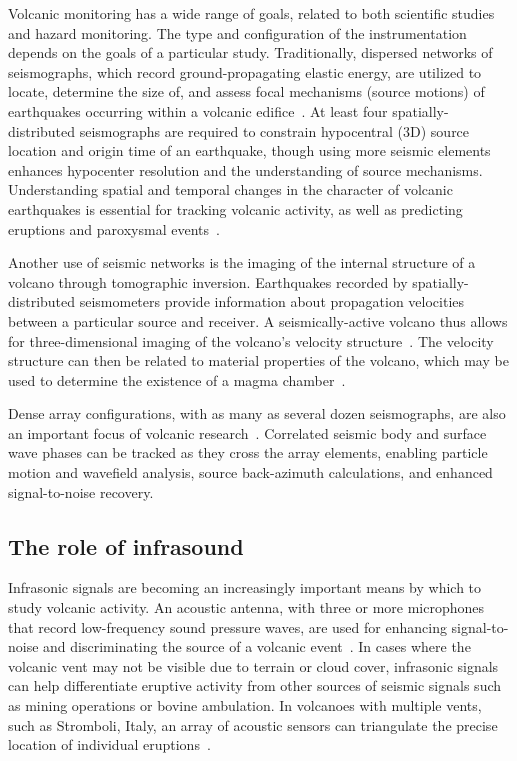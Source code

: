 Volcanic monitoring has a wide range of goals, related to both
scientific studies and hazard monitoring. The type and configuration
of the instrumentation depends on the goals of a particular study.
Traditionally, dispersed networks of seismographs, which record 
ground-propagating elastic energy, are utilized to locate, determine the 
size of, and assess focal mechanisms (source motions) of earthquakes 
occurring within a volcanic edifice~\cite{Chouet03}. 
At least four 
spatially-distributed seismographs are required to constrain hypocentral 
(3D) source location and origin time of an earthquake, though
using more seismic elements enhances hypocenter resolution and the 
understanding of source mechanisms. Understanding spatial and temporal 
changes in the character of volcanic earthquakes is essential
for tracking volcanic activity, as well as predicting eruptions 
and paroxysmal events~\cite{McNutt96}. 


Another use of seismic networks is the imaging of the internal
structure of a volcano through tomographic inversion.  Earthquakes
recorded by spatially-distributed seismometers provide information
about propagation velocities between a particular source and receiver.
A seismically-active volcano thus allows for three-dimensional imaging
of the volcano's velocity structure~\cite{Benz96,Phillips91}. The
velocity structure can then be related to material properties of the
volcano, which may be used to determine the existence of a
magma chamber~\cite{Lees89,Moran99}.

Dense array configurations, with as many as several dozen
seismographs, are also an important focus of volcanic
research~\cite{Dietel89,Neuberg94}. Correlated seismic body and surface wave
phases can be tracked as they cross the array elements, enabling
particle motion and wavefield analysis, source back-azimuth calculations,
and enhanced signal-to-noise recovery.

\subsection{The role of infrasound}

Infrasonic signals are
becoming an increasingly important means by which to study volcanic
activity. An acoustic antenna, with three or more microphones that
record low-frequency sound pressure waves, are used for enhancing
signal-to-noise and discriminating the source of a volcanic
event~\cite{Johnson03}. In cases where the volcanic vent may not be
visible due to terrain or cloud cover, infrasonic signals can 
help differentiate eruptive activity from other sources of seismic 
signals such as mining operations or bovine ambulation. In volcanoes with multiple vents,
such as Stromboli, Italy, an array of acoustic sensors can
triangulate the precise location of individual eruptions~\cite{Ripepe02}.

